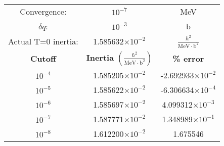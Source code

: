 \begin{tabular}{|ccc|}
	\hline Convergence: & $10^{-7}$ & MeV \\ 
	$\delta q$: & $10^{-3}$ & b \\ 
	Actual T=0 inertia: & 1.585632$\times10^{-2}$ & $\frac{\hbar^2}{\mathrm{MeV \cdot b}^2}$ \\ \hline
	\textbf{Cutoff} & \textbf{Inertia} $\left(\frac{\hbar^2}{\mathrm{MeV \cdot b}^2}\right)$ & \textbf{\% error} \\ \hline
	$10^{-4}$ & 1.585205$\times10^{-2}$ & -2.692933$\times10^{-2}$ \\
	$10^{-5}$ & 1.585622$\times10^{-2}$ & -6.306634$\times10^{-4}$ \\
	$10^{-6}$ & 1.585697$\times10^{-2}$ & 4.099312$\times10^{-3}$ \\
	$10^{-7}$ & 1.587771$\times10^{-2}$ & 1.348989$\times10^{-1}$ \\
	$10^{-8}$ & 1.612200$\times10^{-2}$ & 1.675546 \\ \hline
\end{tabular} 
